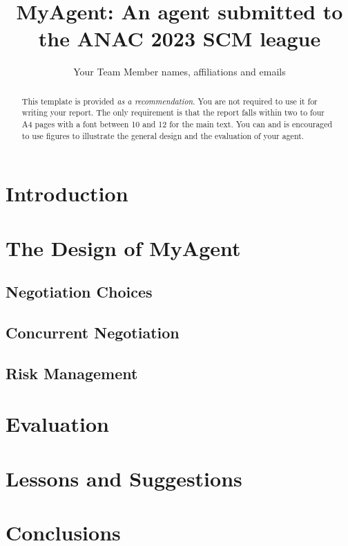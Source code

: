 \documentclass{article}
\title{MyAgent: An agent submitted to the ANAC 2023 SCM league}
\author{Your Team Member names, affiliations and emails}
\begin{document}
\maketitle
\begin{abstract}
	This template is provided \emph{as a recommendation}. You are not required
	to use it for writing your report. The only requirement is that the report
	falls within two to four A4 pages with a font between 10 and 12 for the main
	text. You can and is encouraged to use figures to illustrate the general
	design and the evaluation of your agent.
\end{abstract}
\section{Introduction}
\section{The Design of MyAgent}
\subsection{Negotiation Choices}
\subsection{Concurrent Negotiation}
\subsection{Risk Management}
\section{Evaluation}
\section{Lessons and Suggestions}
\section*{Conclusions}
\end{document}
